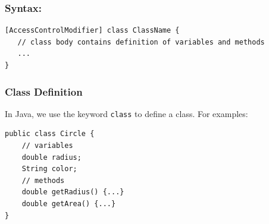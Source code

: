 \documentclass[11pt,a4paper]{article}
\begin{document}
\begin{figure}[H]
\centering
\begin{minipage}[c]{0.5\linewidth}
\end{minipage}
\quad
\begin{minipage}[c]{0.40\linewidth}
\end{minipage}
\end{figure}
\subsubsection*{Syntax:}
\begin{lstlisting}[numbers=none, xleftmargin=.25in]
[AccessControlModifier] class ClassName {
   // class body contains definition of variables and methods
   ...
}
\end{lstlisting}
\subsubsection*{Class Definition}
In Java, we use the keyword \texttt{class} to define a class. For examples:
\begin{lstlisting}[numbers=none, xleftmargin=.25in]
public class Circle { 
    // variables
    double radius;    
    String color;
    // methods
    double getRadius() {...}
    double getArea() {...}
}
\end{lstlisting} 
\end{document}
